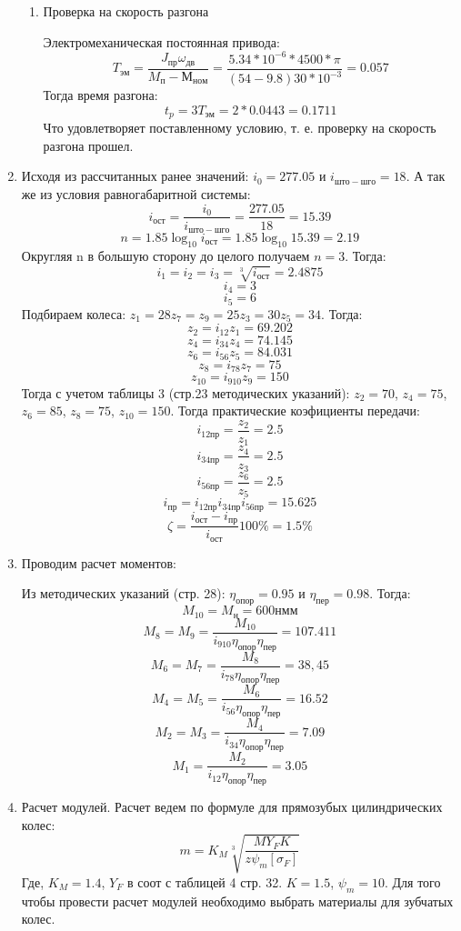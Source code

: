 \documentclass{article}
\begin{document}
\begin{enumerate}
\begin{enumerate}
		\item Проверка на скорость разгона

		Электромеханическая постоянная привода:
		$$
		T_{эм} = \frac{ J_{пр} \omega_{дв}}{M_п - М_{ном}} = \frac{5.34 * 10^{-6} * 4500 * \pi}{\left(54 - 9.8\right) 30 * 10^{-3}} = 0.057
		$$
		Тогда время разгона:
		$$
		t_p = 3 T_{эм} = 2 * 0.0443 = 0.1711
		$$
		Что удовлетворяет поставленному условию, т. е. проверку на скорость разгона прошел.
	\end{enumerate}
	\item Исходя из рассчитанных ранее значений: $i_0 = 277.05$ и $i_{што-шго} = 18$. А так же из условия равногабаритной системы:
	$$
	i_{ост} = \frac{i_0}{i_{што-шго}} = \frac{277.05}{18} = 15.39
	$$
	$$
	n = 1.85 \log_{10}{i_{ост}} = 1.85 \log_{10}{15.39} = 2.19
	$$
	Округляя n в большую сторону до целого получаем $n = 3$. Тогда:
	$$
	i_1 = i_2 = i_3 = \sqrt[3]{i_{ост}} = 2.4875
	$$
	$$
	i_4 = 3
	$$
	$$
	i_5 = 6
	$$
	Подбираем колеса: $z_1 = 28 z_7 = z_9 = 25 z_3 = 30 z_5 = 34$. Тогда:
	$$
	z_2 = i_{12}z_1 = 69.202
	$$
	$$
	z_4 = i_{34}z_4 = 74.145
	$$
	$$
	z_6 = i_{56}z_5 = 84.031
	$$
	$$
	z_8 = i_{78}z_7 = 75
	$$
	$$
	z_{10} = i_{9 10}z_9 = 150
	$$
	Тогда с учетом таблицы 3 (стр.23 методических указаний): $z_2 = 70$, $z_4 = 75$, $z_6 = 85$, $z_8 = 75$, $z_{10} = 150$. Тогда практические коэфициенты передачи:
	$$
	i_{12 пр} = \frac{z_2}{z_1} = 2.5
	$$
	$$
	i_{34 пр} = \frac{z_4}{z_3} = 2.5
	$$
	$$
	i_{56 пр} = \frac{z_6}{z_5} = 2.5
	$$
	$$
	i_{пр} = i_{12 пр} i_{34 пр} i_{56 пр} = 15.625
	$$
	$$
	\zeta = \frac{i_{ост} - i_{пр}}{i_{ост}} 100\% = 1.5\%
	$$
	\item
	Проводим расчет моментов:

	Из методических указаний (стр. 28): $ \eta_{опор} = 0.95$ и $ \eta_{пер} = 0.98$. Тогда:
	$$
	M_{10} = M_{н} = 600 н мм
	$$
	$$
	M_8 = M_9 = \frac{M_{10}}{i_{9 10} \eta_{опор} \eta_{пер}} = 107.411
	$$
	$$
	M_6 = M_7 = \frac{M_{8}}{i_{78} \eta_{опор} \eta_{пер}} = 38,45
	$$
	$$
	M_4 = M_5 = \frac{M_{6}}{i_{56} \eta_{опор} \eta_{пер}} = 16.52
	$$
	$$
	M_2 = M_3 = \frac{M_{4}}{i_{34} \eta_{опор} \eta_{пер}} = 7.09
	$$
	$$
	M_1 = \frac{M_{2}}{i_{12} \eta_{опор} \eta_{пер}} = 3.05
	$$
	\item Расчет модулей. Расчет ведем по формуле для прямозубых цилиндрических колес:
	$$
	m = K_M \sqrt[3]{\frac{M Y_F K}{z \psi_m [ \sigma_F]}}
	$$
	Где, $K_M = 1.4$, $Y_F$ в соот с таблицей 4 стр. 32. $K = 1.5$, $ \psi_m = 10 $.
	Для того чтобы провести расчет модулей необходимо выбрать материалы для зубчатых колес.


\end{enumerate}
\end{document}

